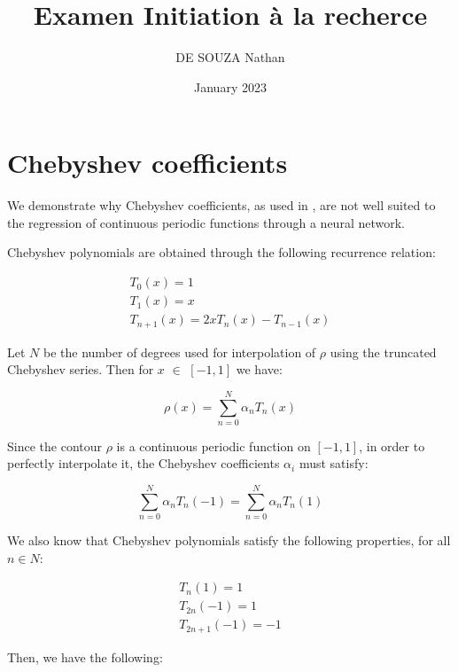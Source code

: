 \documentclass[10pt,twocolumn]{article}
\title{Examen Initiation à la recherce}
\author{DE SOUZA Nathan}
\date{January 2023}
\begin{document}
\section{Chebyshev coefficients}


    We demonstrate why Chebyshev coefficients, as used
in \cite{xu2019explicit}, are not well suited to the regression of continuous
periodic functions through a neural network.

Chebyshev polynomials are obtained through the following
recurrence relation:

\begin{equation}
    \begin{array}{c}
          T_0 \left(x\right) = 1 \\ 
          T_1 \left(x\right) = x \\
          T_{n+1} \left(x\right) = 2 x T_n \left(x\right) - T_{n-1} \left(x\right)
    \end{array}
\end{equation}

Let $N$ be the number of degrees used for interpolation of $\rho$ using the truncated Chebyshev series. Then for $x$ $\in$ $\left[ -1, 1 \right] $ we have:

\begin{equation}
    \rho \left(x\right) = \sum_{n=0}^{N} \alpha_n T_n \left(x\right)
\end{equation}

Since the contour $\rho$ is a continuous periodic function on
$\left[ -1, 1 \right] $, in order to perfectly interpolate it, the Chebyshev
coefficients $\alpha_i$ must satisfy:

\begin{equation}
    \sum_{n=0}^{N} \alpha_n T_n \left(-1\right) = \sum_{n=0}^{N} \alpha_n T_n \left(1\right)
\end{equation}

We also know that Chebyshev polynomials satisfy the
following properties, for all $n \in N $:

\begin{equation}
    \begin{array}{c}
          T_n \left(1\right) = 1 \\ 
          T_{2n} \left(-1\right) = 1 \\
          T_{2n+1} \left(-1\right) = -1
    \end{array}
\end{equation}

Then, we have the following:
\end{document}
